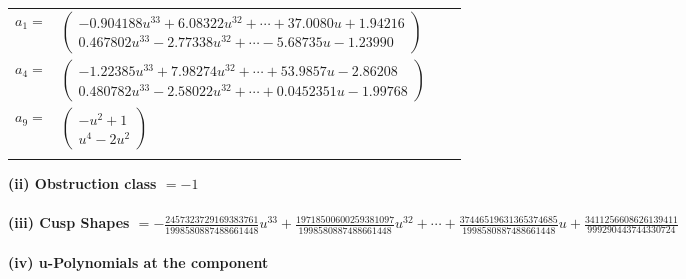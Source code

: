 \documentclass[1p]{elsarticle_modified}
\theoremstyle{definition}
\begin{document}
\begin{tabular}{m{7pt} m{180pt} m{7pt} m{180pt} }
\flushright $a_{1}=$&$\begin{pmatrix}-0.904188 u^{33}+6.08322 u^{32}+\cdots+37.0080 u+1.94216\\0.467802 u^{33}-2.77338 u^{32}+\cdots-5.68735 u-1.23990\end{pmatrix}$ \\
\flushright $a_{4}=$&$\begin{pmatrix}-1.22385 u^{33}+7.98274 u^{32}+\cdots+53.9857 u-2.86208\\0.480782 u^{33}-2.58022 u^{32}+\cdots+0.0452351 u-1.99768\end{pmatrix}$ \\
\flushright $a_{9}=$&$\begin{pmatrix}- u^2+1\\u^4-2 u^2\end{pmatrix}$\\&\end{tabular}
\flushleft \textbf{(ii) Obstruction class $= -1$}\\~\\
\flushleft \textbf{(iii) Cusp Shapes $= -\frac{2457323729169383761}{1998580887488661448} u^{33}+\frac{19718500600259381097}{1998580887488661448} u^{32}+\cdots+\frac{37446519631365374685}{1998580887488661448} u+\frac{3411256608626139411}{999290443744330724}$}\\~\\
\newpage\renewcommand{\arraystretch}{1}
\flushleft \textbf{(iv) u-Polynomials at the component}\newline \\
\end{document}
